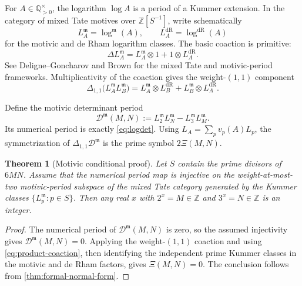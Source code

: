 \documentclass[11pt]{article}
\newtheorem{theorem}{Theorem}[section]
\theoremstyle{definition}
\theoremstyle{remark}
\newcommand{\Z}{\mathbb Z}
\newcommand{\Q}{\mathbb Q}
\begin{document}
For $A\in\Q_{>0}^{\times}$, the logarithm $\log A$ is a period of a Kummer
extension.  In the category of mixed Tate motives over
$\Z[S^{-1}]$, write schematically
\[
 L_A^{\mathfrak m}=\log^{\mathfrak m}(A),
 \qquad
 L_A^{\mathrm{dR}}=\log^{\mathrm{dR}}(A)
\]
for the motivic and de Rham logarithm classes.  The basic coaction is
primitive:
\begin{equation}\label{eq:primitive-coaction}
 \Delta L_A^{\mathfrak m}
 =L_A^{\mathfrak m}\otimes1+1\otimes L_A^{\mathrm{dR}}.
\end{equation}
See Deligne--Goncharov \cite{DeligneGoncharov2005} and Brown
\cite{Brown2017} for the mixed Tate and motivic-period frameworks.
Multiplicativity of the coaction gives the weight-$(1,1)$ component
\begin{equation}\label{eq:product-coaction}
 \Delta_{1,1}\bigl(L_A^{\mathfrak m}L_B^{\mathfrak m}\bigr)
 =L_A^{\mathfrak m}\otimes L_B^{\mathrm{dR}}
  +L_B^{\mathfrak m}\otimes L_A^{\mathrm{dR}}.
\end{equation}

Define the motivic determinant period
\begin{equation}\label{eq:motivic-D}
 \mathcal D^{\mathfrak m}(M,N)
 :=L_2^{\mathfrak m}L_N^{\mathfrak m}
   -L_3^{\mathfrak m}L_M^{\mathfrak m}.
\end{equation}
Its numerical period is exactly \eqref{eq:logdet}.  Using
$L_A=\sum_pv_p(A)L_p$, the symmetrization of
$\Delta_{1,1}\mathcal D^{\mathfrak m}$ is the prime symbol
$2\Xi(M,N)$.

\begin{theorem}[Motivic conditional proof]\label{thm:motivic-conditional}
Let $S$ contain the prime divisors of $6MN$.  Assume that the numerical
period map is injective on the weight-at-most-two motivic-period subspace of
the mixed Tate category generated by the Kummer classes
$\{L_p^{\mathfrak m}:p\in S\}$.  Then any real $x$ with
$2^x=M\in\Z$ and $3^x=N\in\Z$ is an integer.
\end{theorem}

\begin{proof}
The numerical period of $\mathcal D^{\mathfrak m}(M,N)$ is zero, so the
assumed injectivity gives
$\mathcal D^{\mathfrak m}(M,N)=0$.  Applying the weight-$(1,1)$ coaction and
using \eqref{eq:product-coaction}, then identifying the independent prime
Kummer classes in the motivic and de Rham factors, gives
$\Xi(M,N)=0$.  The conclusion follows from
\cref{thm:formal-normal-form}.
\end{proof}
\end{document}
